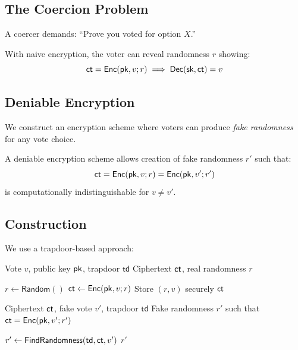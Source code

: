 \documentclass{../shared/luxfhe}
\begin{document}
\subsection{The Coercion Problem}

A coercer demands: ``Prove you voted for option $X$.''

With naive encryption, the voter can reveal randomness $r$ showing:
\[
\mathsf{ct} = \mathsf{Enc}(\mathsf{pk}, v; r) \implies \mathsf{Dec}(\mathsf{sk}, \mathsf{ct}) = v
\]

\subsection{Deniable Encryption}

We construct an encryption scheme where voters can produce \emph{fake randomness} for any vote choice.

\begin{definition}
A deniable encryption scheme allows creation of fake randomness $r'$ such that:
\[
\mathsf{ct} = \mathsf{Enc}(\mathsf{pk}, v; r) = \mathsf{Enc}(\mathsf{pk}, v'; r')
\]
is computationally indistinguishable for $v \neq v'$.
\end{definition}

\subsection{Construction}

We use a trapdoor-based approach:

\begin{algorithm}
\caption{Deniable Vote Encryption}
\begin{algorithmic}[1]
\Require Vote $v$, public key $\mathsf{pk}$, trapdoor $\mathsf{td}$
\Ensure Ciphertext $\mathsf{ct}$, real randomness $r$

\State $r \gets \mathsf{Random}()$
\State $\mathsf{ct} \gets \mathsf{Enc}(\mathsf{pk}, v; r)$
\State Store $(r, v)$ securely
\State \Return $\mathsf{ct}$
\end{algorithmic}
\end{algorithm}

\begin{algorithm}
\caption{Deny Vote (Produce Fake Credentials)}
\begin{algorithmic}[1]
\Require Ciphertext $\mathsf{ct}$, fake vote $v'$, trapdoor $\mathsf{td}$
\Ensure Fake randomness $r'$ such that $\mathsf{ct} = \mathsf{Enc}(\mathsf{pk}, v'; r')$

\State $r' \gets \mathsf{FindRandomness}(\mathsf{td}, \mathsf{ct}, v')$ 
\State \Return $r'$
\end{algorithmic}
\end{algorithm}
\end{document}
